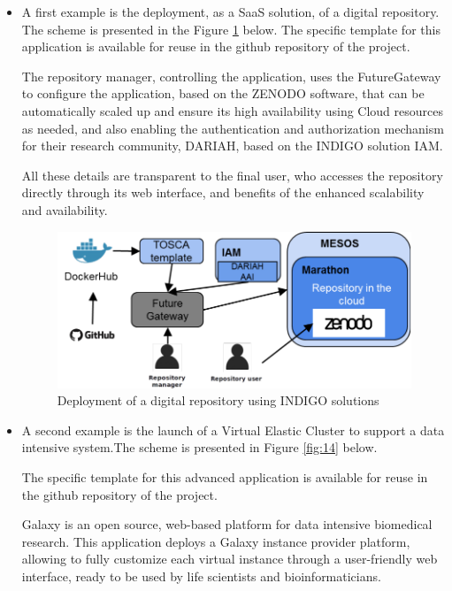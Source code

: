 \documentclass{article}
\begin{document}
\begin{itemize}
\item A first example is the deployment, as a SaaS solution, of a digital repository. The scheme is presented in the Figure \ref{fig:13} below. The specific template for this application is available for reuse in the github repository of the project.

The repository manager, controlling the application, uses the FutureGateway to configure the application, based on the ZENODO software, that can be automatically scaled up and ensure its high availability using Cloud resources as needed, and also enabling the authentication and authorization mechanism  for their research community, DARIAH, based on the INDIGO solution IAM. 

All these details are transparent to the final user, who accesses the repository directly through its web interface, and benefits of the enhanced scalability and availability.



\begin{figure}
  \centering
  \includegraphics[width=\textwidth]{./figs/Figure13.pdf}
  \caption{Deployment of a digital repository using INDIGO solutions}
  \label{fig:13}
\end{figure}



\item A second example is the launch of a Virtual Elastic Cluster to support a data intensive system.The scheme is presented in Figure \ref{fig:14} below. 

The specific template for this advanced application is available for reuse in the github repository of the project.

Galaxy is an open source, web-based platform for data intensive biomedical research. This application deploys a Galaxy instance provider platform, allowing to fully customize each virtual instance through a user-friendly web interface, ready to be used by life scientists and bioinformaticians.


\end{itemize}
\end{document}
